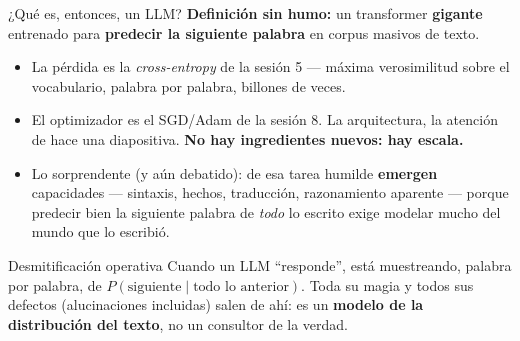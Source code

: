 \documentclass{beamer}
\newcommand{\1}{\mathbb{I}}
\begin{document}
\begin{frame}{¿Qué es, entonces, un LLM?}
\small
\textbf{Definición sin humo:} un transformer \textbf{gigante} entrenado para \textbf{predecir la siguiente palabra} en corpus masivos de texto.
\pause

\begin{itemize}\itemsep5pt
  \item La pérdida es la \emph{cross-entropy} de la sesión 5 --- máxima verosimilitud sobre el vocabulario, palabra por palabra, billones de veces.
  \item El optimizador es el SGD/Adam de la sesión 8. La arquitectura, la atención de hace una diapositiva. \textbf{No hay ingredientes nuevos: hay escala.} \pause
  \item Lo sorprendente (y aún debatido): de esa tarea humilde \textbf{emergen} capacidades --- sintaxis, hechos, traducción, razonamiento aparente --- porque predecir bien la siguiente palabra de \emph{todo} lo escrito exige modelar mucho del mundo que lo escribió. \pause
\end{itemize}

\vspace{0.1cm}
\begin{block}{Desmitificación operativa}
Cuando un LLM ``responde'', está muestreando, palabra por palabra, de $P(\text{siguiente} \mid \text{todo lo anterior})$. Toda su magia y todos sus defectos (alucinaciones incluidas) salen de ahí: es un \textbf{modelo de la distribución del texto}, no un consultor de la verdad.
\end{block}
\end{frame}
\end{document}
